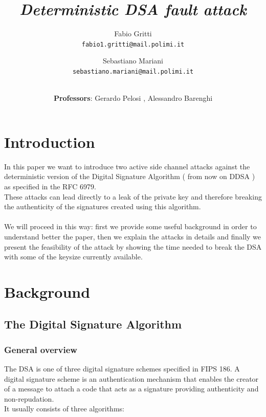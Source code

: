 \documentclass[11pt,english]{article}
\begin{document}
\title{\textit{Deterministic DSA fault attack}}
\author{
  Fabio Gritti\\
  \texttt{fabio1.gritti@mail.polimi.it}
  \and
  Sebastiano Mariani\\
  \texttt{sebastiano.mariani@mail.polimi.it}
  \and \\
  \textbf{Professors}: Gerardo Pelosi , Alessandro Barenghi
}
\date{}
\maketitle

\pagestyle{plain}
\tableofcontents

\section{Introduction}
In this paper we want to introduce two active side channel attacks against the deterministic version of the Digital Signature Algorithm ( from now on DDSA ) as specified in the RFC 6979\cite{rfc}.\\
These attacks can lead directly to a leak of the private key and therefore breaking the authenticity of the signatures created using this algorithm. \\\\
We will proceed in this way: first we provide some useful background in order to understand better the paper, then we explain the attacks in details and finally we present the feasibility of the attack by showing the time needed to break the DSA with some of the keysize currently available.

\section{Background}

\subsection{The Digital Signature Algorithm}

\subsubsection{General overview}
The DSA is one of three digital signature schemes specified in FIPS 186\cite{fips}. A digital signature scheme is an authentication mechanism that enables the creator of a message to attach a code that acts as a signature providing authenticity and non-repudation. \\It usually consists of three algorithms:
\end{document}

